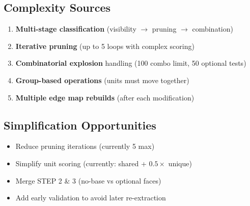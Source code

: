 \documentclass[11pt]{article}
\begin{document}
\subsection{Complexity Sources}
\begin{enumerate}
    \item \textbf{Multi-stage classification} (visibility $\rightarrow$ pruning $\rightarrow$ combination)
    \item \textbf{Iterative pruning} (up to 5 loops with complex scoring)
    \item \textbf{Combinatorial explosion} handling (100 combo limit, 50 optional tests)
    \item \textbf{Group-based operations} (units must move together)
    \item \textbf{Multiple edge map rebuilds} (after each modification)
\end{enumerate}

\subsection{Simplification Opportunities}
\begin{itemize}
    \item Reduce pruning iterations (currently 5 max)
    \item Simplify unit scoring (currently: shared + $0.5 \times$ unique)
    \item Merge STEP 2 \& 3 (no-base vs optional faces)
    \item Add early validation to avoid later re-extraction
\end{itemize}
\end{document}
